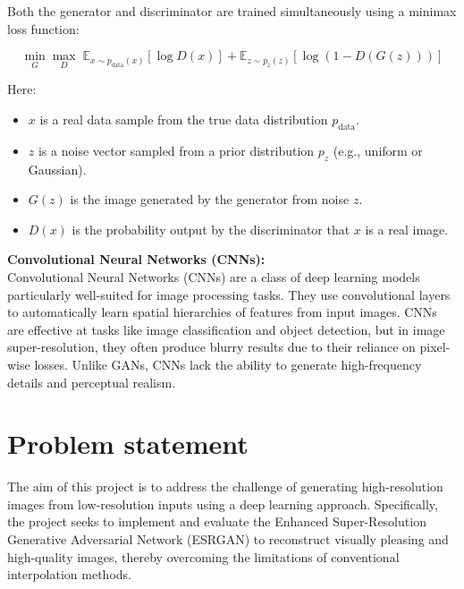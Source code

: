 Both the generator and discriminator are trained simultaneously using a minimax loss function:

\begin{equation}
    \min_G \max_D \; \mathbb{E}_{x \sim p_{\text{data}}(x)} [\log D(x)] + \mathbb{E}_{z \sim p_z(z)} [\log(1 - D(G(z)))]
\end{equation}

Here:
\begin{itemize}
    \item $x$ is a real data sample from the true data distribution $p_{\text{data}}$.
    \item $z$ is a noise vector sampled from a prior distribution $p_z$ (e.g., uniform or Gaussian).
    \item $G(z)$ is the image generated by the generator from noise $z$.
    \item $D(x)$ is the probability output by the discriminator that $x$ is a real image.
\end{itemize}
\vspace{0.07cm}
\textbf{Convolutional Neural Networks (CNNs):}\\
Convolutional Neural Networks (CNNs) are a class of deep learning models particularly well-suited for image processing tasks. They use convolutional layers to automatically learn spatial hierarchies of features from input images. CNNs are effective at tasks like image classification and object detection, but in image super-resolution, they often produce blurry results due to their reliance on pixel-wise losses. Unlike GANs, CNNs lack the ability to generate high-frequency details and perceptual realism.


  



\section{Problem statement}
The aim of this project is to address the challenge of generating high-resolution images from low-resolution inputs using a deep learning approach. Specifically, the project seeks to implement and evaluate the Enhanced Super-Resolution Generative Adversarial Network (ESRGAN) to reconstruct visually pleasing and high-quality images, thereby overcoming the limitations of conventional interpolation methods.

